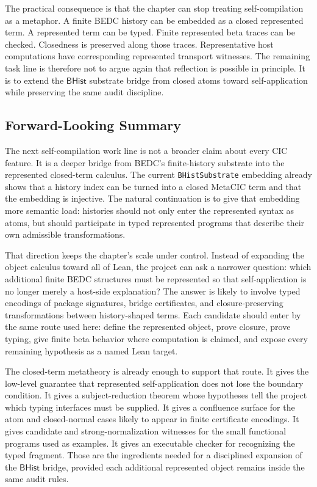 The practical consequence is that the chapter can stop treating
self-compilation as a metaphor.  A finite BEDC history can be embedded as a
closed represented term.  A represented term can be typed.  Finite represented
beta traces can be checked.  Closedness is preserved along those traces.
Representative host computations have corresponding represented transport
witnesses.  The remaining task line is therefore not to argue again that
reflection is possible in principle.  It is to extend the $\mathsf{BHist}$
substrate bridge from closed atoms toward self-application while preserving
the same audit discipline.

\subsection{Forward-Looking Summary}
\label{subsec:session-closing-forward-looking}

The next self-compilation work line is not a broader claim about every CIC
feature.  It is a deeper bridge from BEDC's finite-history substrate into the
represented closed-term calculus.  The current \texttt{BHistSubstrate}
embedding already shows that a history index can be turned into a closed
MetaCIC term and that the embedding is injective.  The natural continuation
is to give that embedding more semantic load: histories should not only enter
the represented syntax as atoms, but should participate in typed represented
programs that describe their own admissible transformations.

That direction keeps the chapter's scale under control.  Instead of expanding
the object calculus toward all of Lean, the project can ask a narrower
question: which additional finite BEDC structures must be represented so that
self-application is no longer merely a host-side explanation?  The answer is
likely to involve typed encodings of package signatures, bridge certificates,
and closure-preserving transformations between history-shaped terms.  Each
candidate should enter by the same route used here: define the represented
object, prove closure, prove typing, give finite beta behavior where
computation is claimed, and expose every remaining hypothesis as a named Lean
target.

The closed-term metatheory is already enough to support that route.  It gives
the low-level guarantee that represented self-application does not lose the
boundary condition.  It gives a subject-reduction theorem whose hypotheses
tell the project which typing interfaces must be supplied.  It gives a
confluence surface for the atom and closed-normal cases likely to appear in
finite certificate encodings.  It gives candidate and strong-normalization
witnesses for the small functional programs used as examples.  It gives an
executable checker for recognizing the typed fragment.  Those are the
ingredients needed for a disciplined expansion of the $\mathsf{BHist}$ bridge,
provided each additional represented object remains inside the same audit
rules.

